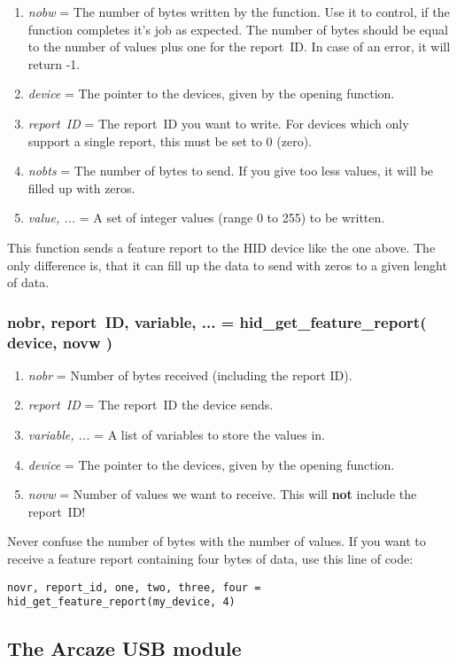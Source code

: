\documentclass[11pt,parskip=half,a4paper]{scrartcl}
\begin{document}
\begin{enumerate}
\item \emph{nobw} = The number of bytes written by the function. Use it to control, if the function completes it's job as expected. The number of bytes should be equal to the number of values plus one for the report~ID. In case of an error, it will return -1.
\item \emph{device} = The pointer to the devices, given by the opening function.
\item \emph{report~ID} = The report~ID you want to write. For devices which only support a single report, this must be set to 0 (zero).
\item \emph{nobts} = The number of bytes to send. If you give too less values, it will be filled up with zeros.
\item \emph{value, ...} = A set of integer values (range 0 to 255) to be written.
\end{enumerate}

This function sends a feature report to the HID device like the one above. The only difference is, that it can fill up the data to send with zeros to a given lenght of data.

\subsubsection{nobr, report~ID, variable, ... = hid\_get\_feature\_report( device, novw )}

\begin{enumerate}
\item \emph{nobr} = Number of bytes received (including the report ID).
\item \emph{report~ID} = The report~ID the device sends.
\item \emph{variable, ...} = A list of variables to store the values in.
\item \emph{device} = The pointer to the devices, given by the opening function.
\item \emph{novw} = Number of values we want to receive. This will \textbf{not} include the report~ID!
\end{enumerate}

Never confuse the number of bytes with the number of values. If you want to receive a feature report containing four bytes of data, use this line of code:

\verb|novr, report_id, one, two, three, four = hid_get_feature_report(my_device, 4)|

\subsection{The Arcaze USB module}
\end{document}
